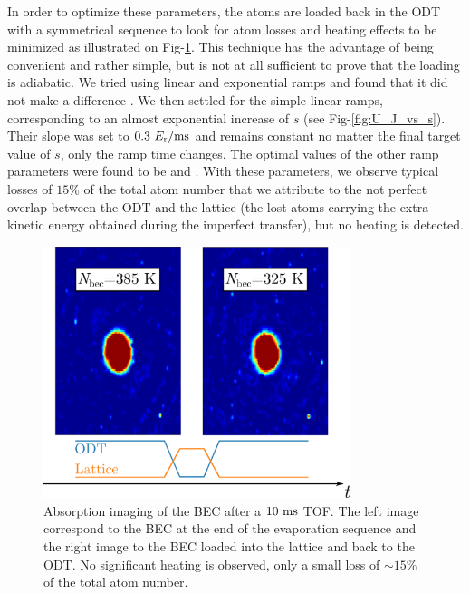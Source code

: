 In order to optimize these parameters, the atoms are loaded back in the ODT with a symmetrical sequence to look for atom losses and heating effects to be minimized as illustrated on Fig-\ref{fig:lattice_up_and_down}. This technique has the advantage of being convenient and rather simple, but is not at all sufficient to prove that the loading is adiabatic. We tried using linear and exponential ramps and found that it did not make a difference \cite{carcy_these}. We then settled for the simple linear ramps, corresponding to an almost exponential increase of $s$ (see Fig-\ref{fig:U_J_vs_s}). Their slope was set to $0.3 \ E_{\rm{r}}/\rm{ms}$ and remains constant no matter the final target value of $s$, only the ramp time changes. The optimal values of the other ramp parameters were found to be  and . With these parameters, we observe typical losses of $15 \%$ of the total atom number that we attribute to the not perfect overlap between the ODT and the lattice (the lost atoms carrying the extra kinetic energy obtained during the imperfect transfer), but no heating is detected. 

\begin{figure}
    \centering
    \includegraphics[width=0.8\textwidth]{Fig/Chapter3/lattice_up_and_down.png}
    \caption[Characterisation of the lattice ramps]{Absorption imaging of the BEC after a $10 \ \rm{ms}$ TOF. The left image correspond to the BEC at the end of the evaporation sequence and the right image to the BEC loaded into the lattice and back to the ODT. No significant heating is observed, only a small loss of $\sim 15 \%$ of the total atom number.}
    \label{fig:lattice_up_and_down}
\end{figure}

